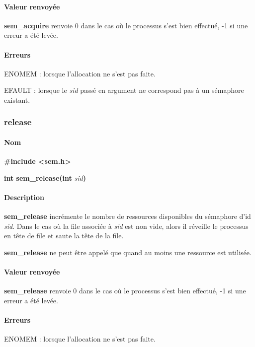 \documentclass[12pt]{article}
\begin{document}
          \paragraph{Valeur renvoyée\\}
          \textbf{sem\_acquire} renvoie 0 dans le cas où le processus s'est bien effectué, -1 si une erreur a été levée.
          \paragraph{Erreurs\\}
          ENOMEM : lorsque l'allocation ne s'est pas faite.

          EFAULT : lorsque le \textit{sid} passé en argument ne correspond pas à un sémaphore existant.
      \newpage
      \subsubsection{release}
          \paragraph{Nom\\}
          \textbf{\#include <sem.h>}

          \textbf{int sem\_release(int }\textit{sid}\textbf{)}
          \paragraph{Description\\}
          \textbf{sem\_release} incrémente le nombre de ressources disponibles du sémaphore d'id \textit{sid}. Dans le cas où la file associée à \textit{sid} est non vide, alors il réveille le processus en tête de file et saute la tête de la file.

          \textbf{sem\_release} ne peut être appelé que quand au moins une ressource est utilisée.

          \paragraph{Valeur renvoyée\\}
          \textbf{sem\_release} renvoie 0 dans le cas où le processus s'est bien effectué, -1 si une erreur a été levée.
          \paragraph{Erreurs\\}
          ENOMEM : lorsque l'allocation ne s'est pas faite.
\end{document}
